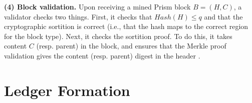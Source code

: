 \noindent \textbf{(4) Block validation.}
Upon  receiving a mined Prism block $B=(H,C)$, a validator checks two things. 
First, it  checks that $Hash( H) \leq q$ and that the cryptographic sortition is correct  (i.e., that the hash  maps to the correct region for the block type).
Next, it checks the sortition proof.  
To do this, it takes content $C$ (resp. parent) in  the block, and ensures that the Merkle proof validation gives the content (resp. parent) digest in the header \cite{merkle}. 





\section{Ledger Formation}
\label{sec:confirmation}

